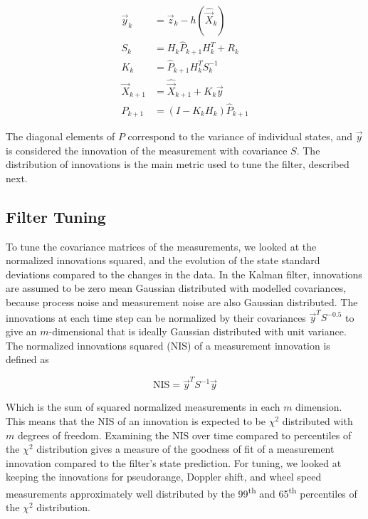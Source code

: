 \documentclass[letterpaper,times]{IONconf}
\begin{document}
\begin{equation}
    \begin{aligned}
        \vec{y}_k &= \vec{z}_k - h(\hat{\vec{X}}_k) \\
        S_k &= H_k \hat{P}_{k+1} H_k^T + R_k\\
        K_k &= \hat{P}_{k+1} H_k^T S_k^{-1}\\
        \vec{X}_{k+1} &= \hat{\vec{X}}_{k+1} + K_k \vec{y}\\
        {P}_{k+1} &= (I-K_k H_k)\hat{P}_{k+1}
    \end{aligned} \label{eq:upd}
\end{equation}

The diagonal elements of $P$ correspond to the variance of individual states, and $\vec{y}$ is considered the innovation of the measurement with covariance $S$. The distribution of innovations is the main metric used to tune the filter, described next.

\subsection{Filter Tuning}

\newcommand{\nis}{\mathrm{NIS}}

To tune the covariance matrices of the measurements, we looked at the normalized innovations squared, and the evolution of the state standard deviations compared to the changes in the data. In the Kalman filter, innovations are assumed to be zero mean Gaussian distributed with modelled covariances, because process noise and measurement noise are also Gaussian distributed. The innovations at each time step can be normalized by their covariances $\vec{y}^T S^{-0.5}$ to give an $m$-dimensional that is ideally Gaussian distributed with unit variance. The normalized innovations squared ($\nis$) of a measurement innovation is defined as 

\begin{equation*}
    \nis = \vec{y}^T S^{-1} \vec{y}
\end{equation*}

Which is the sum of squared normalized measurements in each $m$ dimension. This means that the $\nis$ of an innovation is expected to be $\chi^2$ distributed with $m$ degrees of freedom. Examining the $\nis$ over time compared to percentiles of the $\chi^2$ distribution gives a measure of the goodness of fit of a measurement innovation compared to the filter's state prediction. For tuning, we looked at keeping the innovations for pseudorange, Doppler shift, and wheel speed measurements approximately well distributed by the 99\textsuperscript{th} and 65\textsuperscript{th} percentiles of the $\chi^2$ distribution.
\end{document}
